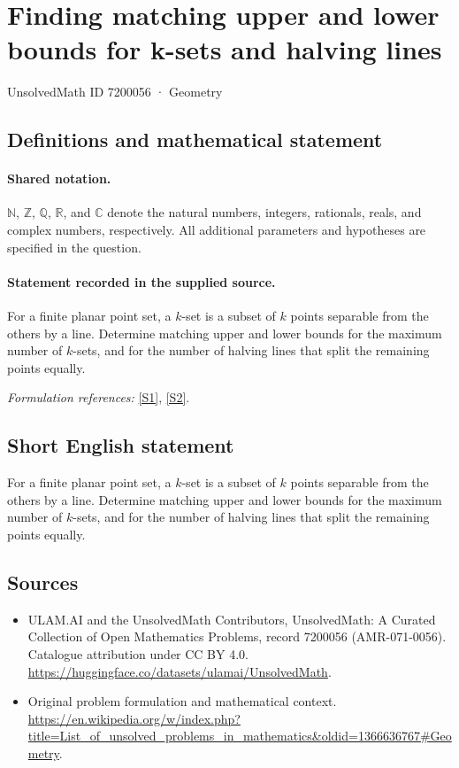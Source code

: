 \documentclass[11pt]{article}
\newcommand{\sref}[2]{\hyperlink{source:#1:#2}{[S#2]}}
\begin{document}
\setcounter{section}{7200055}
\section{Finding matching upper and lower bounds for k-sets and halving lines}\label{7200056}
{\small UnsolvedMath ID 7200056 · Geometry}
\subsection{Definitions and mathematical statement}

\paragraph{Shared notation.}$\mathbb N$, $\mathbb Z$, $\mathbb Q$, $\mathbb R$, and $\mathbb C$ denote the natural numbers, integers, rationals, reals, and complex numbers, respectively. All additional parameters and hypotheses are specified in the question.


\paragraph{Statement recorded in the supplied source.}
For a finite planar point set, a $k$-set is a subset of $k$ points separable from the others by a line. Determine matching upper and lower bounds for the maximum number of $k$-sets, and for the number of halving lines that split the remaining points equally.
\par\smallskip\textit{Formulation references:} \sref{7200056}{1}, \sref{7200056}{2}.
\subsection{Short English statement}
For a finite planar point set, a $k$-set is a subset of $k$ points separable from the others by a line. Determine matching upper and lower bounds for the maximum number of $k$-sets, and for the number of halving lines that split the remaining points equally.
\subsection{Sources}
\begin{itemize}
\item[\hypertarget{source:7200056:1}{S1}] ULAM.AI and the UnsolvedMath Contributors, UnsolvedMath: A Curated Collection of Open Mathematics Problems, record 7200056 (AMR-071-0056). Catalogue attribution under CC BY 4.0.
\url{https://huggingface.co/datasets/ulamai/UnsolvedMath}.
\item[\hypertarget{source:7200056:2}{S2}] Original problem formulation and mathematical context.
\url{https://en.wikipedia.org/w/index.php?title=List_of_unsolved_problems_in_mathematics&oldid=1366636767#Geometry}.
\end{itemize}
\label{end:7200056}
\end{document}
